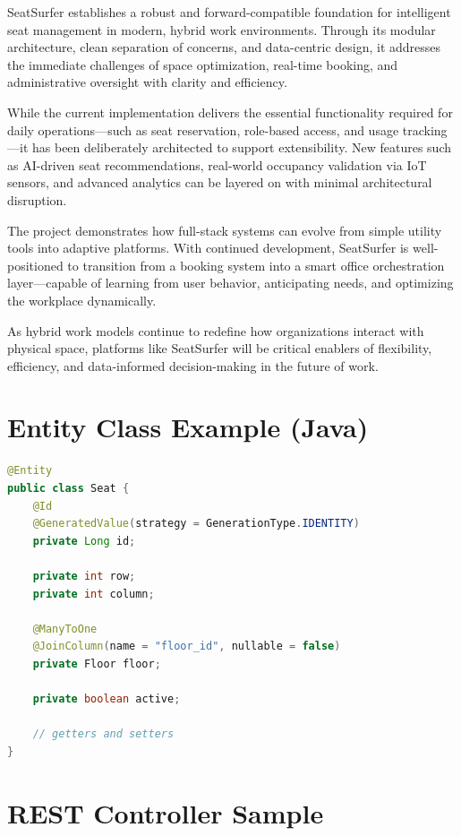 \documentclass[12pt,a4paper]{report} %
\begin{document}
SeatSurfer establishes a robust and forward-compatible foundation for intelligent seat management in modern, hybrid work environments. Through its modular architecture, clean separation of concerns, and data-centric design, it addresses the immediate challenges of space optimization, real-time booking, and administrative oversight with clarity and efficiency.

While the current implementation delivers the essential functionality required for daily operations—such as seat reservation, role-based access, and usage tracking—it has been deliberately architected to support extensibility. New features such as AI-driven seat recommendations, real-world occupancy validation via IoT sensors, and advanced analytics can be layered on with minimal architectural disruption.

The project demonstrates how full-stack systems can evolve from simple utility tools into adaptive platforms. With continued development, SeatSurfer is well-positioned to transition from a booking system into a smart office orchestration layer—capable of learning from user behavior, anticipating needs, and optimizing the workplace dynamically.

As hybrid work models continue to redefine how organizations interact with physical space, platforms like SeatSurfer will be critical enablers of flexibility, efficiency, and data-informed decision-making in the future of work.

\newpage

\appendix

\chapter{Entity Class Example (Java)}
\label{appendix:entity}

\begin{lstlisting}[language=Java, caption=Seat Entity (Java), label=lst:seat-entity]
@Entity
public class Seat {
    @Id
    @GeneratedValue(strategy = GenerationType.IDENTITY)
    private Long id;

    private int row;
    private int column;

    @ManyToOne
    @JoinColumn(name = "floor_id", nullable = false)
    private Floor floor;

    private boolean active;

    // getters and setters
}
\end{lstlisting}

\chapter{REST Controller Sample}
\label{appendix:controller}
\end{document}
